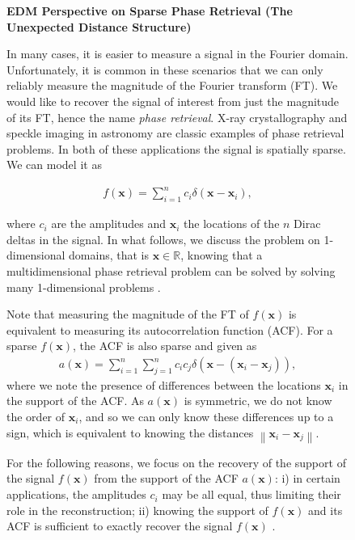 \documentclass[10pt,double]{IEEEtran}
\providecommand{\R}{\ensuremath{\mathbb{R}}}
\providecommand{\norm}[1]{\left\lVert#1\right\rVert}
\renewcommand{\vec}[1]{\ensuremath{\boldsymbol{#1}}}
\providecommand{\vx}{\vec{x}} \providecommand{\vy}{\vec{y}}
\begin{document}
\begin{figure*}[t]
\selectfont
\begin{spmagbox}
\textbf{EDM Perspective on Sparse Phase Retrieval (The Unexpected Distance Structure)}
\\
\label{sub:box_phase_retrieval_by_edms}
\fontsize{9pt}{10pt}\selectfont
\begin{multicols}{2}

In many cases, it is easier to measure a signal in the Fourier domain.
Unfortunately, it is common in these scenarios that we can only reliably
measure the magnitude of the Fourier transform (FT). We would like to recover
the signal of interest from just the magnitude of its FT, hence the name
\emph{phase retrieval}. X-ray crystallography
\cite{Millane:1990pt} and speckle imaging in astronomy
\cite{Beavers:1989tj} are classic examples of phase retrieval problems. In
both of these applications the signal is spatially sparse. We can model it as

\begin{align} 
	f(\vx)=\sum_{i=1}^n c_i \delta(\vx-\vx_i),
\end{align} 

where $c_i$ are the amplitudes and $\vx_i$  the locations of the $n$ Dirac
deltas in the signal. In what follows, we discuss the problem on
1-dimensional domains, that is $\vx\in\R$, knowing that a multidimensional
phase retrieval problem can be solved by solving many 1-dimensional problems
\cite{Ranieri:2013tx}.

Note that measuring the magnitude of the FT of $f(\vx)$ is equivalent to
measuring its autocorrelation function (ACF). For a sparse $f(\vx)$, the ACF
is also sparse and given as
\begin{align}
    a(\vx)=\sum_{i=1}^n\sum_{j=1}^nc_ic_j\delta(\vx-(\vx_i-\vx_j)),
\end{align}
where we note the presence of differences between the locations $\vx_i$ in the
support of the ACF. As $a(\vx)$ is symmetric, we do not know the order of
$\vx_i$, and so we can only know these differences up to a sign, which is
equivalent to knowing the distances $\norm{\vx_i - \vx_j}$.

For the following reasons, we focus on the recovery of the support of the
signal $f(\vx)$ from the support of the ACF $a(\vx)$: i) in certain
applications, the amplitudes $c_i$ may be all equal, thus limiting their role
in the reconstruction; ii) knowing the support of $f(\vx)$ and its ACF
is sufficient to exactly recover the signal $f(\vx)$
\cite{Ranieri:2013tx}. 


\end{multicols}
\end{spmagbox}
\end{figure*}
\end{document}
